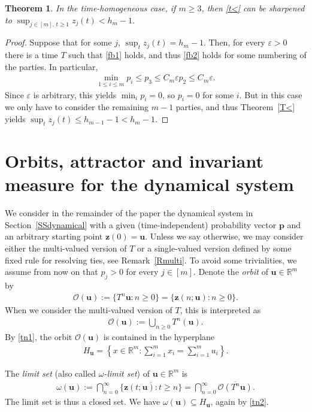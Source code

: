 \documentclass[11pt,reqno,tbtags,a4paper]{amsart}
\numberwithin{equation}{section}
\renewcommand\le{\leq}
\renewcommand\ge{\geq}
\renewcommand\leq{\leqslant}
\renewcommand\geq{\geqslant}
\theoremstyle{plain}%
\newtheorem{theorem}{Theorem}[section]
\theoremstyle{definition}
\theoremstyle{remark}
\newcommand{\refT}[1]{Theorem~\ref{#1}}
\newcommand{\refR}[1]{Remark~\ref{#1}}
\newcommand{\refSS}[1]{Section~\ref{#1}}
\newcommand\set[1]{\ensuremath{\{#1\}}}
\newcommand\lrset[1]{\ensuremath{\left\{#1\right\}}}
\newcommand\bbR{\mathbb R}
\newcommand\go{\omega}
\newcommand\eps{\varepsilon}
\newcommand\cL{{\omega}}
\newcommand\cO{\mathcal O}
\newcommand\vp{\mathbf{p}}
\newcommand\vu{\mathbf{u}}
\newcommand\vz{\mathbf{z}}
\newcommand\0{{\boldsymbol 0}}
\newcommand\1{{\boldsymbol 1}}
\begin{document}
\begin{theorem}\label{TR<<}
In the time-homogeneous case, if $m\ge3$,
then \eqref{t<} can be sharpened to
$\sup_{j\in[m],\,t\ge 1}z_j(t)<h_m-1$.
\end{theorem}

\begin{proof}
  Suppose that for some $j$, $\sup_t z_j(t)=h_m-1$. 
Then, for every $\eps>0$ there is a time $T$ such that \eqref{fb1} holds,
and thus \eqref{fb2} holds for some numbering of the parties. 
In particular,
\begin{align}
  \min_{1\le i\le m} p_i \le p_3 \le C_m \eps p_2 \le C_m \eps.
\end{align}
Since $\eps$ is arbitrary, this yields $\min_i p_i=0$, so $p_i=0$ for some $i$.
But in this case we only have to consider the remaining $m-1$ parties,
and thus \refT{T<} yields $\sup_t z_j(t)\le h_{m-1}-1<h_m-1$.
\end{proof}



\section{Orbits, attractor and invariant measure for the dynamical system}\label{Sorb}
We consider in the remainder of the paper the dynamical system in
\refSS{SSdynamical} with  a given (time-independent) 
probability vector $\vp$ and an arbitrary starting point
$\vz(0)=\vu$.
Unless we say otherwise, we may consider either the multi-valued version of $T$
or a single-valued version defined by some fixed rule for resolving ties,
see \refR{Rmulti}.
To avoid some trivialities, we assume from now on that $p_j>0$
for every $j\in[m]$. 
Denote the \emph{orbit} of $\vu\in\bbR^m$ by
\begin{align}\label{Ou}
  \cO(\vu):=\set{T^n\vu:n\ge0}=\set{\vz(n;\vu):n\ge0}.
\end{align}
When we consider the multi-valued version of $T$,
this is interpreted as 
\begin{align}\label{Ou2}
  \cO(\vu):=\bigcup_{n\ge0}T^n(\vu).
\end{align}
%
By \eqref{tn1}, the orbit $\cO(\vu)$ is contained in the
hyperplane
\begin{align}\label{Hu}
H_\vu = \lrset{x\in\bbR^m: \sum_{i=1}^m x_i = \sum_{i=1}^m u_i}.
\end{align}

The
\emph{limit set} 
(also called \emph{$\go$-limit set}) 
of $\vu\in\bbR^m$ is
\begin{align}\label{Lu}
  \cL(\vu) := \bigcap_{n=0}^\infty\overline{\set{\vz(t;\vu):t\ge n}}
=\bigcap_{n=0}^\infty\overline{\cO(T^n \vu)}.
\end{align}
The limit set is thus a closed set.
We have $\cL(\vu)\subseteq H_\vu$, again by \eqref{tn2}.
\end{document}
